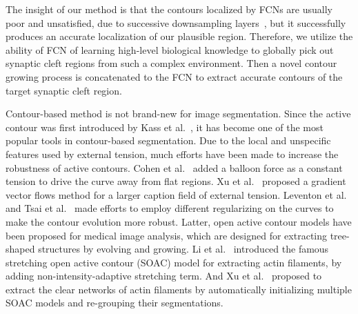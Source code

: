 


The insight of our method is that the contours localized by FCNs are usually poor and unsatisfied, due to successive downsampling layers~\cite{Chen2017}, but it successfully produces an accurate localization of our plausible region.
%
Therefore, we utilize the ability of FCN of learning high-level biological knowledge to globally pick out synaptic cleft regions from such a complex environment.
%
Then a novel contour growing process is concatenated to the FCN to extract accurate contours of the target synaptic cleft region.
%

Contour-based method is not brand-new for image segmentation.
Since the active contour was first introduced by Kass et al.~\cite{Kass1988}, it has become one of the most popular tools in contour-based segmentation.
Due to the local and unspecific features used by external tension, much efforts have been made to increase the robustness of active contours.
Cohen et al.~\cite{Cohen1991} added a balloon force as a constant tension to drive the curve away from flat regions.
Xu et al.~\cite{Xu1998} proposed a gradient vector flows method for a larger caption field of external tension.
Leventon et al.~\cite{Leventon2003Statistical} and Tsai et al.~\cite{Tsai2003A} made efforts to employ different regularizing on the curves to make the contour evolution more robust.
Latter, open active contour models have been proposed for medical image analysis, which are designed for extracting tree-shaped structures \cite{Li2009Actin,Xu2013EXTRACTION} by evolving and growing.
Li et al.~\cite{Li2009Actin} introduced the famous stretching open active contour (SOAC) model for extracting actin filaments, by adding non-intensity-adaptive stretching term.
And Xu et al.~\cite{Xu2013EXTRACTION} proposed to extract the clear networks of actin filaments by automatically initializing multiple SOAC models and re-grouping their segmentations.


